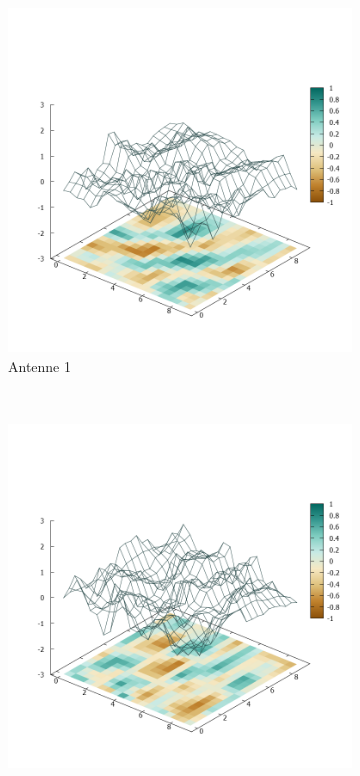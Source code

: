 \begin{figure}[h!]
        \centering
        \begin{subfigure}[b]{0.4\textwidth}
            \centering
            \includegraphics[width=\textwidth]{img/Plate0_A1.png}
            \caption[lorem]{Antenne 1}
            \label{fig:Plate0_A1}
        \end{subfigure}%
\\
        \begin{subfigure}[b]{0.4\textwidth}
            \centering
            \includegraphics[width=\textwidth]{img/Plate0_A2.png}

\end{subfigure}
\end{figure}
